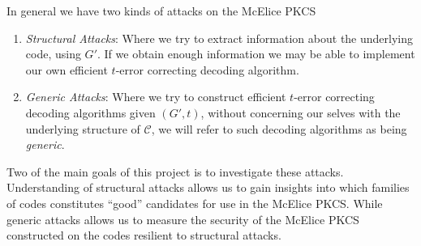 In general we have two kinds of attacks on the McElice PKCS
\begin{enumerate}
    \item \textit{Structural Attacks}: Where we try to extract information about the underlying code, using $G'$. If we obtain enough information we may be able to implement our own efficient $t$-error correcting decoding algorithm.
    \item \textit{Generic Attacks}: Where we try to construct efficient $t$-error correcting decoding algorithms given $(G', t)$, without concerning our selves with the underlying structure of $\mathcal{C}$, we will refer to such decoding algorithms as being \textit{generic}.
\end{enumerate}

Two of the main goals of this project is to investigate these attacks. Understanding of structural attacks allows us to gain insights into which families of codes constitutes ``good'' candidates for use in the McElice PKCS. While generic attacks allows us to measure the security of the McElice PKCS constructed on the codes resilient to structural attacks.
